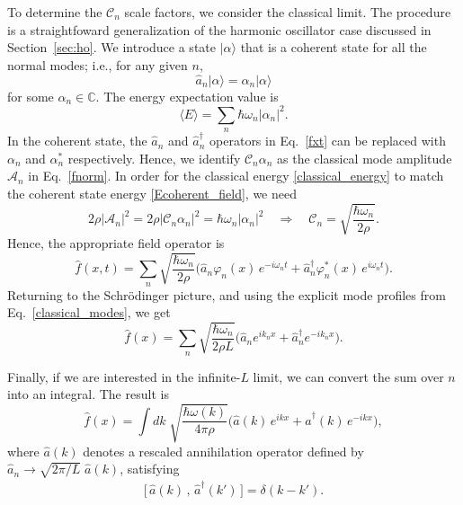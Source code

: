 \documentclass[pra,12pt]{revtex4}
\begin{document}
To determine the $\mathcal{C}_n$ scale factors, we consider the
classical limit.  The procedure is a straightfoward generalization of
the harmonic oscillator case discussed in Section~\ref{sec:ho}.  We
introduce a state $|\alpha\rangle$ that is a coherent state for all
the normal modes; i.e., for any given $n$,
\begin{equation}
  \hat{a}_n |\alpha\rangle = \alpha_n |\alpha\rangle
\end{equation}
for some $\alpha_n \in \mathbb{C}$.  The energy expectation value is
\begin{equation}
  \langle E\rangle = \sum_n \hbar \omega_n |\alpha_n|^2.
  \label{Ecoherent_field}
\end{equation}
In the coherent state, the $\hat{a}_n$ and $\hat{a}_n^\dagger$
operators in Eq.~\eqref{fxt} can be replaced with $\alpha_n$ and
$\alpha_n^*$ respectively.  Hence, we identify $\mathcal{C}_n
\alpha_n$ as the classical mode amplitude $\mathcal{A}_n$ in
Eq.~\eqref{fnorm}.  In order for the classical energy
\eqref{classical_energy} to match the coherent state energy
\eqref{Ecoherent_field}, we need
\begin{equation}
  2\rho |\mathcal{A}_n|^2 = 2 \rho |\mathcal{C}_n\alpha_n|^2
  = \hbar \omega_n |\alpha_n|^2 \quad \Rightarrow \quad
  \mathcal{C}_n = \sqrt{\frac{\hbar\omega_n}{2\rho}}.
\end{equation}
Hence, the appropriate field operator is
\begin{equation}
  \hat{f}(x,t) = \sum_n \sqrt{\frac{\hbar\omega_n}{2\rho}}
  \Big(\hat{a}_n \varphi_n(x) \,e^{-i\omega_nt}
  + \hat{a}_n^\dagger \varphi_n^*(x) \, e^{i\omega_nt} \Big).
\end{equation}
Returning to the Schr\"odinger picture, and using the explicit mode
profiles from Eq.~\eqref{classical_modes}, we get
\begin{equation}
  \hat{f}(x) = \sum_n \sqrt{\frac{\hbar\omega_n}{2\rho L}}
  \Big(\hat{a}_n e^{ik_n x}
  + \hat{a}_n^\dagger e^{-ik_n x} \Big).
\end{equation}

Finally, if we are interested in the infinite-$L$ limit, we can
convert the sum over $n$ into an integral.
The result is
\begin{equation}
  \hat{f}(x) = \int dk\; \sqrt{\frac{\hbar\omega(k)}{4\pi\rho}}
  \Big(\hat{a}(k)\, e^{ik x} + \hat{a}^\dagger(k)\, e^{-ik x} \Big),
\end{equation}
where $\hat{a}(k)$ denotes a rescaled annihilation operator defined by
$\hat{a}_n \rightarrow \sqrt{2\pi/L}\; \hat{a}(k)$, satisfying
\begin{align}
  \Big[\,\hat{a}(k)\,,\, \hat{a}^\dagger(k')\,\Big] = \delta(k-k').
\end{align}
\end{document}
